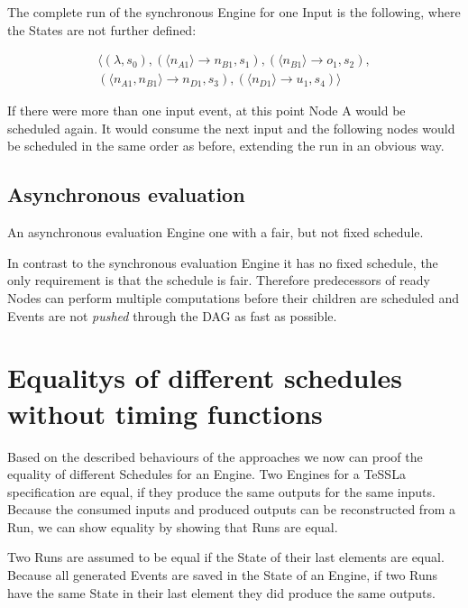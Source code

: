 The complete run of the synchronous Engine for one Input is the following, where the States are not further defined:

\begin{align*}
  \langle
    (\lambda,                                    s_0),
    (\langle n_{A1}         \rangle\rightarrow n_{B1},  s_1),
    (\langle n_{B1}         \rangle\rightarrow o_1,     s_2),\\
    (\langle n_{A1}, n_{B1} \rangle\rightarrow n_{D1},  s_3),
    (\langle n_{D1}         \rangle\rightarrow u_1,     s_4)
  \rangle
\end{align*}

If there were more than one input event, at this point Node A would be scheduled again.
It would consume the next input and the following nodes would be scheduled in the same order as before, extending the run in an obvious way.

\subsection{Asynchronous evaluation}
\label{sec:concepts:behaviour_without_timing:async}

An asynchronous evaluation Engine one with a fair, but not fixed schedule.

In contrast to the synchronous evaluation Engine it has no fixed schedule, the only requirement is that the schedule is fair.
Therefore predecessors of ready Nodes can perform multiple computations before their children are scheduled and Events are not \emph{pushed} through the DAG as fast as possible.

\section{Equalitys of different schedules without timing functions}
\label{sec:concepts:equalitys_without_timing}

Based on the described behaviours of the approaches we now can proof the equality of different Schedules for an Engine.
Two Engines for a TeSSLa specification are equal, if they produce the same outputs for the same inputs.
Because the consumed inputs and produced outputs can be reconstructed from a Run, we can show equality by showing that Runs are equal.

Two Runs are assumed to be equal if the State of their last elements are equal.
Because all generated Events are saved in the State of an Engine, if two Runs have the same State in their last element they did produce the same outputs.


